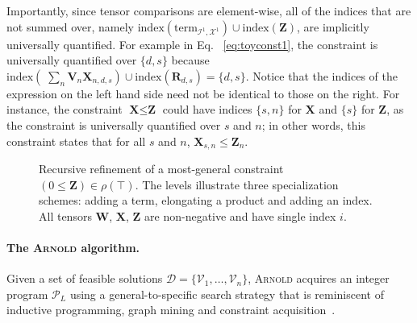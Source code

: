\documentclass{article}
\newcommand{\learner}{\textsc{Arnold}\xspace}
\newcommand{\dataset}{\ensuremath{\mathcal{D}}\xspace}
\newcommand{\variables}{\ensuremath{\mathcal{V}}\xspace}
\newcommand{\indices}{\ensuremath{\mathcal{I}}\xspace}
\newcommand{\factors}{\ensuremath{\mathcal{X}}\xspace}
\newcommand{\program}{\ensuremath{\mathcal{P}}\xspace}
\newcommand{\TERM}[2]{\ensuremath{\mathrm{term}_{#1,#2}}\xspace}
\newcommand{\IDX}[1]{\ensuremath{\mathrm{index}\left(#1\right)}\xspace}
\renewcommand\[{\begin{equation}}
\renewcommand\]{\end{equation}}
\newcommand{\TR}{\textbf{R}\xspace}
\newcommand{\TV}{\textbf{V}\xspace}
\newcommand{\TW}{\textbf{W}\xspace}
\newcommand{\TX}{\textbf{X}\xspace}
\newcommand{\TZ}{\textbf{Z}\xspace}
\begin{document}
Importantly, since tensor comparisons are element-wise, all of the indices that
are not summed over, namely
$\IDX{\TERM{\indices^1}{\factors^1}} \cup \IDX{\TZ}$,
are implicitly universally quantified. For example in Eq. ~\ref{eq:toyconst1},
the constraint is universally quantified over $\{d,s\}$ because
$\IDX{\textstyle \; \sum_n \TV_n \TX_{n,d,s}} \cup \IDX{\TR_{d,s}}=\{d,s\}$.
Notice that the indices of the expression on the left hand side need not be
identical to those on the right.  For instance, the constraint $\TX \le \TZ$
could have indices $\{s,n\}$ for $\TX$ and $\{s\}$ for $\TZ$, as the constraint
is universally quantified over $s$ and $n$;  in other words, this constraint
states that for all $s$ and $n$, $\TX_{s,n} \le \TZ_n$.


\begin{figure}[tb]
    \begin{center}
        \caption{\label{fig:candidates}  Recursive refinement of a most-general
        constraint $(0 \le \TZ) \in \rho(\top)$.  The levels illustrate three
        specialization schemes: adding a term, elongating
        a product and adding an index.  All tensors $\TW$, $\TX$, $\TZ$ are non-negative and have
        single index $i$.}
    \end{center}
\end{figure}


\paragraph{The \learner algorithm.}   Given a set of feasible solutions
$\dataset = \{\variables_1, \ldots, \variables_n\}$, \learner acquires an
integer program $\program_L$ using a general-to-specific search strategy that
is reminiscent of inductive programming, graph mining and constraint
acquisition~\cite{de1997clausal,de2008logical,jiang_coenen_zito_2013,de2018learning}.
\end{document}
